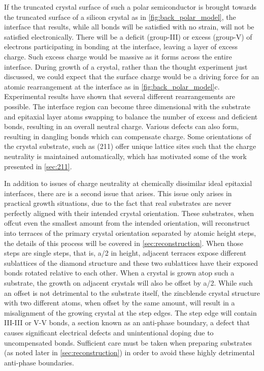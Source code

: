 If the truncated crystal surface of such a polar semiconductor is brought towards the truncated surface of a silicon crystal as in \cref{fig:back_polar_model}, the interface that results, while all bonds will be satisfied with no strain, will not be satisfied electronically. There will be a deficit (group-III) or excess (group-V) of electrons participating in bonding at the interface, leaving a layer of excess charge. Such excess charge would be massive as it forms across the entire interface. During growth of a crystal, rather than the thought experiment just discussed, we could expect that the surface charge would be a driving force for an atomic rearrangement at the interface as in \cref{fig:back_polar_model}c. Experimental results have shown that several different rearrangements are possible. The interface region can become three dimensional with the substrate and epitaxial layer atoms swapping to balance the number of excess and deficient bonds, resulting in an overall neutral charge. Various defects can also form, resulting in dangling bonds which can compensate charge. Some orientations of the crystal substrate, such as (211) offer unique lattice sites such that the charge neutrality is maintained automatically, which has motivated some of the work presented in \cref{sec:211}.

In addition to issues of charge neutrality at chemically dissimilar ideal epitaxial interfaces, there are is a second issue that arises. This issue only arises in practical growth situations, due to the fact that real substrates are never perfectly aligned with their intended crystal orientation. These substrates, when offcut even the smallest amount from the intended orientation, will reconstruct into terraces of the primary crystal orientation separated by atomic height steps, the details of this process will be covered in \cref{sec:reconstruction}. When those steps are single steps, that is, a/2 in height, adjacent terraces expose different sublattices of the diamond structure and these two sublattices have their exposed bonds rotated relative to each other. When a crystal is grown atop such a substrate, the growth on adjacent crystals will also be offset by a/2. While such an offset is not detrimental to the substrate itself, the zincblende crystal structure with two different atoms, when offset by the same amount, will result in a misalignment of the growing crystal at the step edges. The step edge will contain III-III or V-V bonds, a section known as an anti-phase boundary, a defect that causes significant electrical defects and unintentional doping due to uncompensated bonds. Sufficient care must be taken when preparing substrates (as noted later in \cref{sec:reconstruction}) in order to avoid these highly detrimental anti-phase boundaries.

